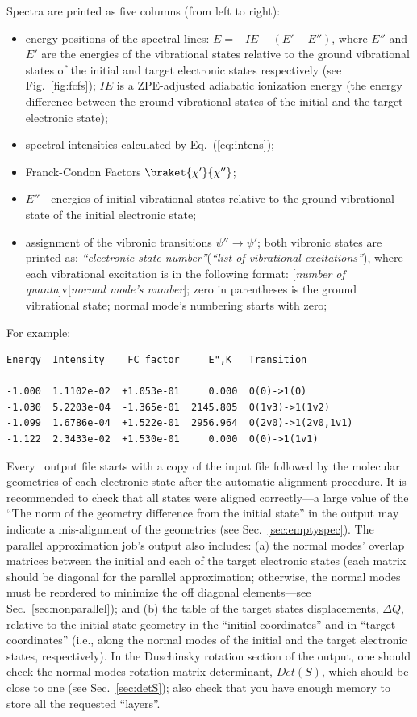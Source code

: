 \documentclass[11pt]{article}
\begin{document}
Spectra are printed as five columns (from left to right):
\begin{itemize}
\item energy positions of the spectral lines: $E=-IE-(E'-E'')$, where $E''$ and $E'$ are the energies
of the vibrational states relative to the ground vibrational states of the initial and target
electronic states respectively (see Fig.~\ref{fig:fcfs}); 
$IE$ is a ZPE-adjusted adiabatic ionization energy 
(the energy difference between the ground vibrational states of the initial and the target electronic state);
\item spectral intensities calculated by Eq.~(\ref{eq:intens});
\item Franck-Condon Factors $\braket{\chi '}{\chi''}$;
\item $E''$---energies of initial vibrational states relative to the ground vibrational state 
of the initial electronic state;
\item assignment of the vibronic transitions $\psi''\to\psi '$; both vibronic states are
printed as: {\em ``electronic state number''}({\em``list of vibrational excitations''}), 
where each vibrational excitation is in the following format: [{\em number of quanta}]v[{\em normal mode's number}];
zero in parentheses is the ground vibrational state; normal mode's numbering starts with zero;
\end{itemize}

For example:
\begin{lstlisting}[frame=single,framerule=0pt]
Energy  Intensity    FC factor     E",K   Transition

-1.000  1.1102e-02  +1.053e-01     0.000  0(0)->1(0)
-1.030  5.2203e-04  -1.365e-01  2145.805  0(1v3)->1(1v2)
-1.099  1.6786e-04  +1.522e-01  2956.964  0(2v0)->1(2v0,1v1)
-1.122  2.3433e-02  +1.530e-01     0.000  0(0)->1(1v1)
\end{lstlisting}

Every \ezFCF\ output file starts with a copy of the input \xml file followed by the 
molecular geometries of each electronic state after the automatic alignment procedure. 
It is recommended to check that all states were aligned correctly---a large 
value of the ``The norm of the geometry difference from the initial state'' in the output
may indicate a mis-alignment of the geometries (see Sec.~\ref{sec:emptyspec}).
The parallel approximation job's output also includes: 
(a) the normal modes' overlap matrices between the initial and each of the
target electronic states (each matrix should be diagonal for the parallel approximation;
otherwise, the normal modes must be reordered to minimize the off diagonal elements---see 
Sec.~\ref{sec:nonparallel});
and (b) the table of the target states displacements, 
$\Delta Q$, relative to the initial state geometry in the ``initial coordinates''
and in ``target coordinates'' (i.e., along the normal modes of the initial and the target electronic states, respectively).
In the Duschinsky rotation section of the output, one should check the normal modes rotation matrix determinant,
$Det(S)$, which should be close to one (see Sec.~\ref{sec:detS}); also check that you have enough
memory to store all the requested ``layers''. 
\end{document}
